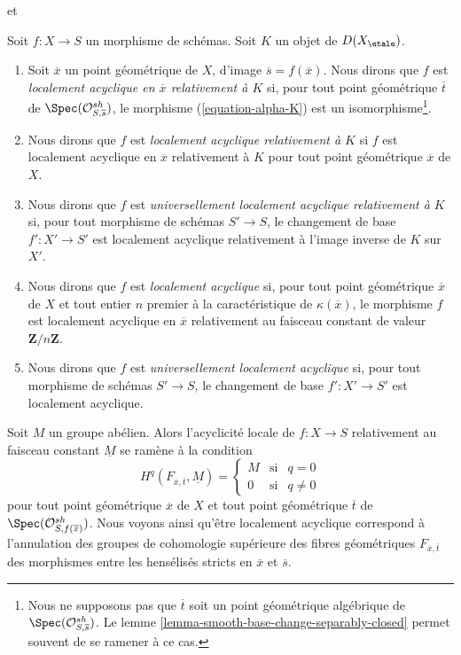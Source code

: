 \begin{definition}
\label{definition-locally-acyclic}
\begin{reference}
\cite[définition 2.12, page 242]{SGA4.5} et
\cite[définition (1.3), page 54]{SGA4.5}
\end{reference}
Soit $f : X \to S$ un morphisme de schémas.
Soit $K$ un objet de $D(X_\etale)$.
\begin{enumerate}
\item
Soit $\overline{x}$ un point géométrique de $X$, d'image
$\overline{s} = f(\overline{x})$.
Nous dirons que $f$ est {\it localement acyclique en $\overline{x}$ relativement à $K$}
si, pour tout point géométrique $\overline{t}$ de
$\Spec(\mathcal{O}^{sh}_{S, \overline{s}})$, le
morphisme (\ref{equation-alpha-K}) est un isomorphisme\footnote{Nous ne
supposons pas que $\overline{t}$ soit un point géométrique algébrique de
$\Spec(\mathcal{O}^{sh}_{S, \overline{s}})$. Le
lemme \ref{lemma-smooth-base-change-separably-closed} permet souvent
de se ramener à ce cas.}.
\item Nous dirons que $f$ est {\it localement acyclique relativement à $K$}
si $f$ est localement acyclique en $\overline{x}$ relativement à $K$
pour tout point géométrique $\overline{x}$ de $X$.
\item Nous dirons que $f$ est {\it universellement localement acyclique relativement à $K$}
si, pour tout morphisme de schémas $S' \to S$, le changement de base $f' : X' \to S'$
est localement acyclique relativement à l'image inverse de $K$ sur $X'$.
\item Nous dirons que $f$ est {\it localement acyclique} si, pour tout point
géométrique $\overline{x}$ de $X$ et tout entier $n$ premier à la caractéristique
de $\kappa(\overline{x})$, le morphisme $f$ est localement acyclique
en $\overline{x}$ relativement au faisceau constant de valeur
$\mathbf{Z}/n\mathbf{Z}$.
\item Nous dirons que $f$ est {\it universellement localement acyclique} si,
pour tout morphisme de schémas $S' \to S$, le changement de base $f' : X' \to S'$
est localement acyclique.
\end{enumerate}
\end{definition}

\noindent
Soit $M$ un groupe abélien. Alors l'acyclicité locale de $f : X \to S$
relativement au faisceau constant $\underline{M}$ se ramène
à la condition
$$
H^q(F_{\overline{x}, \overline{t}}, \underline{M}) =
\left\{
\begin{matrix}
M & \text{si} & q = 0 \\
0 & \text{si} & q \not = 0
\end{matrix}
\right.
$$
pour tout point géométrique $\overline{x}$ de $X$ et tout point
géométrique $\overline{t}$ de $\Spec(\mathcal{O}^{sh}_{S, f(\overline{x})})$.
Nous voyons ainsi qu'être localement acyclique correspond à
l'annulation des groupes de cohomologie supérieure des fibres géométriques
$F_{\overline{x}, \overline{t}}$ des morphismes entre les
hensélisés stricts en $\overline{x}$ et $\overline{s}$.

